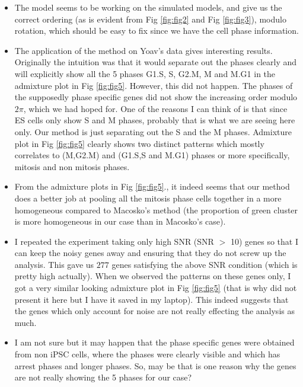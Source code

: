 \documentclass[11pt]{article}
\begin{document}
\begin{itemize}
\item The model seems to be working on the simulated models, and give us the correct ordering (as is evident from Fig \ref{fig:fig2} and Fig \ref{fig:fig3}), modulo rotation, which should be easy to fix since we have the cell phase information.

\item The application of the method on Yoav's data gives interesting results. Originally the intuition was that it would separate out the phases clearly and will explicitly show all the 5 phases G1.S, S, G2.M, M and M.G1 in the admixture plot in Fig \ref{fig:fig5}. However, this did not happen. The phases of the supposedly phase specific genes did not show the increasing order modulo $2 \pi$, which we had hoped for. One of the reasons I can think of is that since ES cells only show S and M phases, probably that is what we are seeing here only. Our method is just separating out the S and the M phases. Admixture plot in Fig \ref{fig:fig5} clearly shows two distinct patterns which mostly correlates to (M,G2.M) and (G1.S,S and M.G1) phases or more specifically, mitosis and non mitosis phases. 

\item From the admixture plots in Fig \ref{fig:fig5}., it indeed seems that our method does a better job at pooling all the mitosis phase cells together in a more homogeneous compared to Macosko's method (the proportion of green cluster is more homogeneous in our case than in Macosko's case). 

\item I repeated the experiment taking only high SNR (SNR $>$ 10) genes so that I can keep the noisy genes away and ensuring that they do not screw up the analysis. This gave us $277$ genes satisfying the above SNR condition (which is pretty high actually). When we observed the patterns on these genes only, I got a very similar looking admixture plot in Fig \ref{fig:fig5} (that is why did not present it here but I have it saved in my laptop). This indeed suggests that the genes which only account for noise are not really effecting the analysis as much.

\item I am not sure but it may happen that the phase specific genes were obtained from non iPSC cells, where the phases were clearly visible and which has arrest phases and longer phases. So, may be that is one reason why the genes are not really showing the 5 phases for our case?

\end{itemize}
\end{document}
